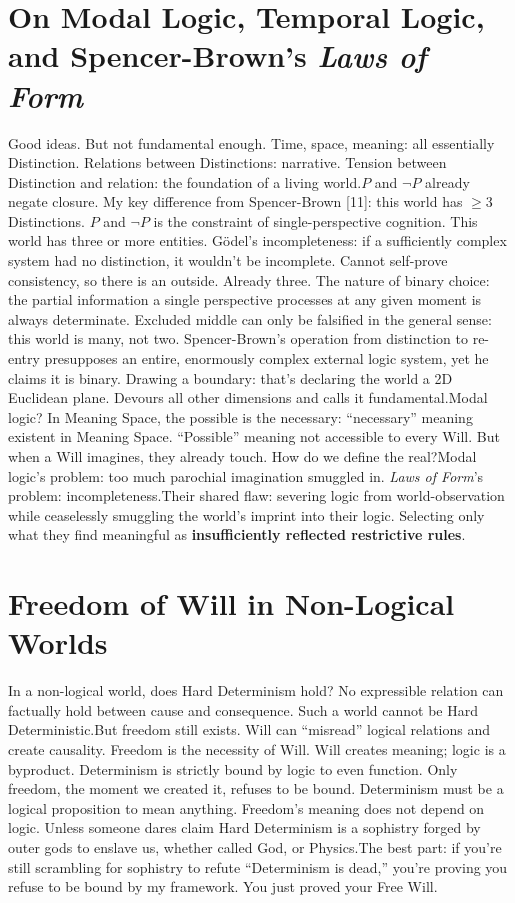 \documentclass[11pt]{article}
\renewcommand{\\}[1][\mynewlineskip]{\oldnewline[#1]}
\begin{document}
\section{On Modal Logic, Temporal Logic, and Spencer-Brown's \textit{Laws of Form}}
Good ideas. But not fundamental enough. Time, space, meaning: all essentially Distinction. Relations between Distinctions: narrative. Tension between Distinction and relation: the foundation of a living world.\\
$P$ and $\neg P$ already negate closure. My key difference from Spencer-Brown [11]: this world has $\geq 3$ Distinctions. $P$ and $\neg P$ is the constraint of single-perspective cognition. This world has three or more entities. Gödel's incompleteness: if a sufficiently complex system had no distinction, it wouldn't be incomplete. Cannot self-prove consistency, so there is an outside. Already three. The nature of binary choice: the partial information a single perspective processes at any given moment is always determinate. Excluded middle can only be falsified in the general sense: this world is many, not two. Spencer-Brown's operation from distinction to re-entry presupposes an entire, enormously complex external logic system, yet he claims it is binary. Drawing a boundary: that's declaring the world a 2D Euclidean plane. Devours all other dimensions and calls it fundamental.\\
Modal logic? In Meaning Space, the possible is the necessary: ``necessary'' meaning existent in Meaning Space. ``Possible'' meaning not accessible to every Will. But when a Will imagines, they already touch. How do we define the real?\\
Modal logic's problem: too much parochial imagination smuggled in. \textit{Laws of Form}'s problem: incompleteness.\\
Their shared flaw: severing logic from world-observation while ceaselessly smuggling the world's imprint into their logic. Selecting only what they find meaningful as \textbf{insufficiently reflected restrictive rules}.

\section{Freedom of Will in Non-Logical Worlds}
In a non-logical world, does Hard Determinism hold? No expressible relation can factually hold between cause and consequence. Such a world cannot be Hard Deterministic.\\
But freedom still exists. Will can ``misread'' logical relations and create causality. Freedom is the necessity of Will. Will creates meaning; logic is a byproduct. Determinism is strictly bound by logic to even function. Only freedom, the moment we created it, refuses to be bound. Determinism must be a logical proposition to mean anything. Freedom's meaning does not depend on logic. Unless someone dares claim Hard Determinism is a sophistry forged by outer gods to enslave us, whether called God, or Physics.\\
The best part: if you're still scrambling for sophistry to refute ``Determinism is dead,'' you're proving you refuse to be bound by my framework. You just proved your Free Will.
\end{document}
